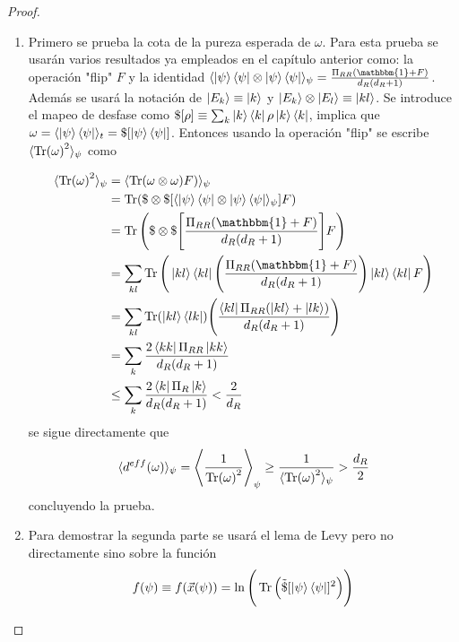 \begin{proof}
\begin{enumerate}
\item
Primero se prueba la cota de la pureza esperada de $\omega$. Para esta prueba se usarán varios resultados ya empleados en el capítulo anterior como: la operación "flip"  $F$ y la identidad $\langle \ket{\psi} \bra{\psi} \otimes \ket{\psi} \bra{\psi} \rangle_{\psi} =  \frac{\Pi_{RR}(\mathbbm{1}+F)}{d_{R}(d_{R}+1)}$. Además se usará la notación de $ \ket{E_{k}} \equiv \ket{k}$ y $\ket{E_{k}} \otimes \ket{E_{l}} \equiv \ket{kl}$. Se introduce el mapeo de desfase como $ \$[ \rho ] \equiv  \sum_{k} \ket{k} \bra{k} \rho \ket{k}\bra{k}$, implica que $\omega= \langle \ket{\psi}\bra{\psi} \rangle_{t}= \$ [\ket{\psi}\bra{\psi}]$. Entonces usando la operación "flip"  se escribe $\langle \Tr (\omega)^{2} \rangle_{\psi}$ como
 
\begin{align*}
\langle \Tr (\omega)^{2} \rangle_{\psi} &= \langle \Tr(\omega \otimes \omega)F) \rangle_{\psi}\\
&= \Tr(\$ \otimes \$ [ \langle \ket{\psi} \bra{\psi} \otimes \ket{\psi} \bra{\psi} \rangle_{\psi}]F)\\
&=\Tr \Bigg( \$ \otimes \$ \Bigg[ \frac{\Pi_{RR}(\mathbbm{1}+F)}{d_{R}(d_{R}+1)} \Bigg]F \Bigg)\\
&= \sum_{kl} \Tr \Bigg(  \ket{kl}\bra{kl}  \Bigg(  \frac{\Pi_{RR}(\mathbbm{1}+F)}{d_{R}(d_{R}+1)} \Bigg) \ket{kl}\bra{kl} F \Bigg)\\
&=\sum_{kl} \Tr ( \ket{kl}\bra{lk} ) \Bigg( \frac{\bra{kl} \Pi_{RR}(\ket{kl}+\ket{lk})}{d_{R}(d_{R}+1)}  \Bigg)\\
&=\sum_{k} \frac{2 \bra{kk} \Pi_{RR}\ket{kk}}{d_{R}(d_{R}+1)} \\
&\leq \sum_{k} \frac{2 \bra{k} \Pi_{R}\ket{k}}{d_{R}(d_{R}+1)} < \frac{2}{d_{R}}
\end{align*}
se sigue directamente que 
\begin{equation}
\langle d^{eff}(\omega) \rangle_{\psi} = \Bigg \langle \frac{1}{\Tr (\omega)^{2}} \Bigg \rangle_{\psi} \geq \frac{1}{\langle \Tr (\omega)^{2} \rangle_{\psi}} > \frac{d_{R}}{2}
\end{equation}
concluyendo la prueba.
\item
Para demostrar la segunda parte se usará el lema de Levy pero no directamente sino sobre la función 
\begin{equation}
f(\psi) \equiv f(\vec{x}(\psi)) = \ln \Bigg( \Tr \Big( \tilde{\$}[ \ket{\psi}\bra{\psi}]^{2} \Big) \Bigg)
\end{equation}


\end{enumerate}
\end{proof}
